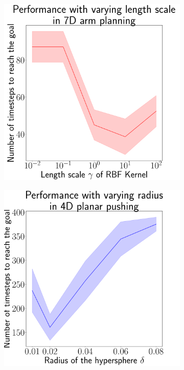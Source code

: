 \begin{figure}[t]
  \centering
  \begin{subfigure}{0.4\linewidth}
    \includegraphics[width=\linewidth]{figures/cmax/gamma.pdf}
  \end{subfigure}
  \hspace{10mm}
  \begin{subfigure}{0.4\linewidth}
    \includegraphics[width=\linewidth]{figures/cmax/radius.pdf}

\end{subfigure}
\end{figure}
